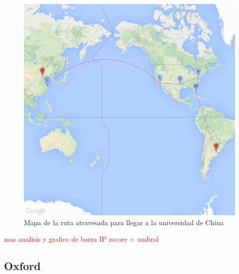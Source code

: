 \begin{figure}[H]
	\begin{center}
		  \includegraphics[scale=0.25]{../results/maps/Tsinghua.png}
		  \caption{Mapa de la ruta atravesada para llegar a la universidad de China}
	\end{center}
\end{figure}

\textcolor{red}{mas analisis y grafico de barra IP zscore + umbral}

\subsection{Oxford}

~

